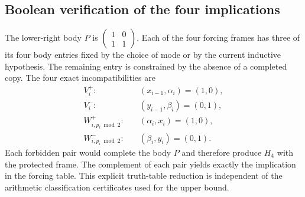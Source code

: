 \subsection{Boolean verification of the four implications}
The lower-right body $P$ is
$\left(\begin{smallmatrix}1&0\\1&1\end{smallmatrix}\right)$.
Each of the four forcing frames has three of its four body entries
fixed by the choice of mode or by the current inductive hypothesis.
The remaining entry is constrained by the absence of a completed
copy. The four exact incompatibilities are
\begin{align*}
 V_i^+:&\quad (x_{i-1},\alpha_i)=(1,0),\\
 V_i^-:&\quad (y_{i-1},\beta_i)=(0,1),\\
 W_{i,p_i\bmod2}^+:&\quad (\alpha_i,x_i)=(1,0),\\
 W_{i,p_i\bmod2}^-:&\quad (\beta_i,y_i)=(0,1).
\end{align*}
Each forbidden pair would complete the body $P$ and therefore
produce $H_4$ with the protected frame. The complement of each
pair yields exactly the implication in the forcing table. This
explicit truth-table reduction is independent of the arithmetic
classification certificates used for the upper bound.
